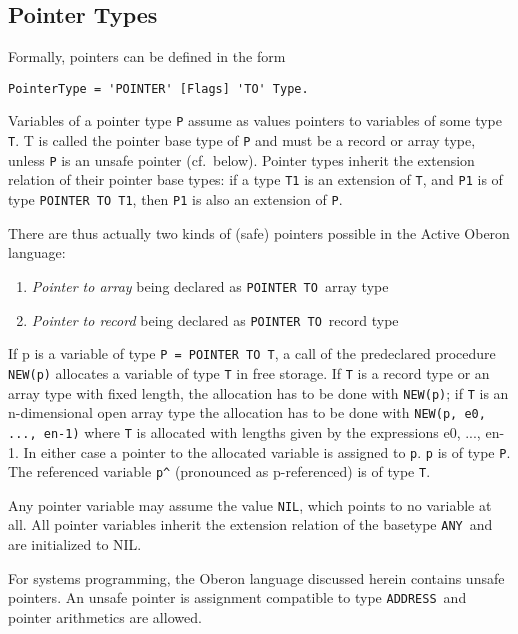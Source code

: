 \documentclass[a4wide,11pt]{article}
\newcommand{\POINTER}{\lstinline"POINTER"}
\newcommand{\TO}{\lstinline"TO"}
\newcommand{\NIL}{\lstinline"NIL"}
\newcommand{\ANY}{\lstinline"ANY"}
\newcommand{\ADDRESS}{\lstinline"ADDRESS"}
\begin{document}
\subsection{Pointer Types}
Formally, pointers can be defined in the form
\begin{lstlisting}[style= ebnf]
PointerType = 'POINTER' [Flags] 'TO' Type.
\end{lstlisting}

Variables of a pointer type \lstinline"P" assume as values pointers to variables of some type \lstinline"T".
T is called the pointer base type of \lstinline"P" and must be a record or array type, unless \lstinline"P" is an unsafe pointer (cf.\ below).
Pointer types inherit the extension relation of their pointer base types: if a type \lstinline"T1" is an extension of \lstinline"T", and \lstinline"P1" is of type \lstinline"POINTER TO T1", then \lstinline"P1" is also an extension of \lstinline"P".


There are thus actually two kinds of (safe) pointers possible in the Active Oberon language:
\begin{enumerate}
\renewcommand{\labelenumi}{(\alph{enumi})}
\item \emph{Pointer to array} being declared as \POINTER\ \TO\ array type
\item \emph{Pointer to record} being declared as \POINTER\ \TO\ record type
\end{enumerate}

If p is a variable of type \lstinline"P = POINTER TO T", a call of the predeclared procedure \lstinline"NEW(p)" allocates a variable of type \lstinline"T" in free storage.
If \lstinline"T" is a record type or an array type with fixed length, the allocation has to be done with \lstinline"NEW(p)";
if \lstinline"T" is an n-dimensional open array type the allocation has to be done with \lstinline"NEW(p, e0, ..., en-1)" where \lstinline"T" is allocated with lengths given by the expressions e0, ..., en-1.
In either case a pointer to the allocated variable is assigned to \lstinline"p". \lstinline"p" is of type \lstinline"P".
The referenced  variable \verb"p^" (pronounced as p-referenced) is of type \lstinline"T".

Any pointer variable may assume the value \NIL, which points to no variable at all.
All pointer variables inherit the extension relation of the basetype \ANY\ and are initialized to NIL.

For systems programming, the Oberon language discussed herein contains unsafe pointers.
An unsafe pointer is assignment compatible to type \ADDRESS\ and pointer arithmetics are allowed.
\end{document}
